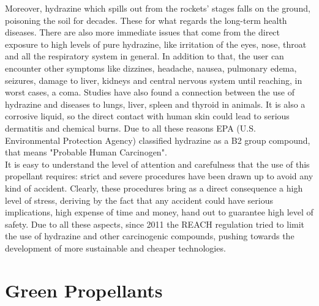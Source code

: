 \documentclass[a4paper]{report}
\begin{document}
Moreover, hydrazine which spills out from the rockets' stages falls on the ground, poisoning the soil for decades. These for what regards the long-term health diseases. There are also more immediate issues that come from the direct exposure to high levels of pure hydrazine, like irritation of the eyes, nose, throat and all the respiratory system in general. In addition to that, the user can encounter other symptoms like dizzines, headache, nausea, pulmonary edema, seizures, damage to liver, kidneys and central nervous system until reaching, in worst cases, a coma. Studies have also found a connection between the use of hydrazine and diseases to lungs, liver, spleen and thyroid in animals. It is also a corrosive liquid, so the direct contact with human skin could lead to serious dermatitis and chemical burns. Due to all these reasons EPA (U.S. Environmental Protection Agency) classified hydrazine as a B2 group compound, that means "Probable Human Carcinogen". \\
It is easy to understand the level of attention and carefulness that the use of this propellant requires: strict and severe procedures have been drawn up to avoid any kind of accident. Clearly, these procedures bring as a direct consequence a high level of stress, deriving by the fact that any accident could have serious implications, high expense of time and money, hand out to guarantee high level of safety. Due to all these aspects, since 2011 the REACH regulation tried to limit the use of hydrazine and other carcinogenic compounds, pushing towards the development of more sustainable and cheaper technologies. \\

\section{Green Propellants}
\end{document}
